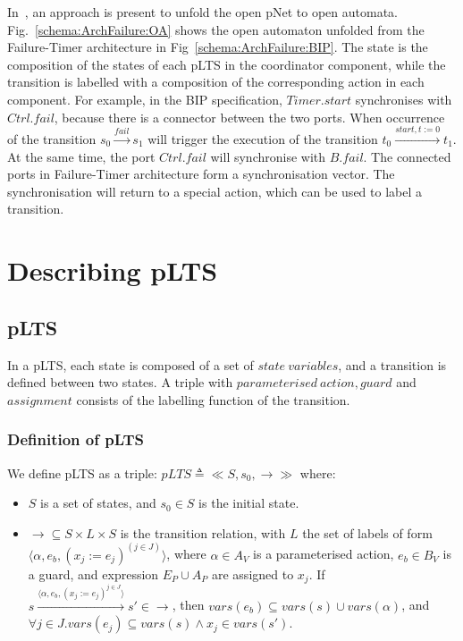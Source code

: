 \documentclass[runningheads,a4paper]{llncs}
\begin{document}
In~\cite{xudong2017smt}, an approach is present to unfold the open pNet to open automata. Fig.~\ref{schema:ArchFailure:OA} shows the open automaton unfolded from the Failure-Timer architecture in Fig~\ref{schema:ArchFailure:BIP}. The state is the composition of the states of each pLTS in the coordinator component, while the transition is labelled with a composition of the corresponding action in each component. For example, in the BIP specification, $Timer.start$ synchronises with $Ctrl.fail$, because there is a connector between the two ports. When occurrence of the transition $s_{0}\xrightarrow{fail}s_{1}$ will trigger the execution of the transition $t_{0}\xrightarrow{start, t:=0}t_{1}$. At the same time, the port $Ctrl.fail$ will synchronise with $B.fail$. The connected ports in Failure-Timer architecture form a synchronisation vector. The synchronisation will return to a special action, which can be used to label a transition.


\section{Describing pLTS}

\subsection{pLTS}

In a pLTS, each state is composed of a set of $\mathit{state\ variables}$, and a transition is defined between two states. A triple with $\mathit{parameterised\ action}, \mathit{guard}$ and $\mathit{assignment}$ consists of the labelling function of the transition.

\subsubsection{Definition of pLTS}
We define pLTS as a triple: $pLTS\triangleq\ll S, s_{0}, \rightarrow \gg$ where:
\begin{itemize}
	\item $S$ is a set of states, and $s_{0}\in S$ is the initial state.
	\item $\rightarrow \subseteq S\times L\times S$ is the transition relation, with $L$ the set of labels of form $\langle\alpha, e_{b}, (x_{j} := e_{j})^{(j\in J)}\rangle$, where $\alpha\in A_{V}$ is a parameterised action, $e_{b}\in B_{V}$ is a guard, and expression $E_{P}\cup A_{P}$ are assigned to $x_{j}$. If $s\xrightarrow{\langle\alpha, e_{b}, (x_{j}:=e_{j})^{j\in J}\rangle}s' \in \rightarrow$, then $vars(e_{b})\subseteq vars(s)\cup vars(\alpha)$, and $\forall j\in J. vars(e_{j})\subseteq vars(s)\wedge x_{j}\in vars(s')$.
\end{itemize}
\end{document}
